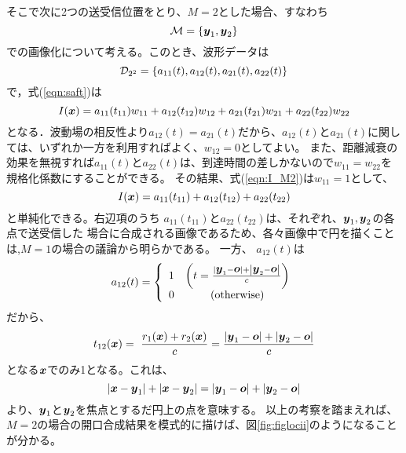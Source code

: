 \documentclass[10pt,a4j,dvipdfmx]{jarticle}
\begin{document}
そこで次に2つの送受信位置をとり、$M=2$とした場合、すなわち
\begin{equation}
	{\cal M} =\left\{ 
		\mbox{\boldmath $y$}_1, \mbox{\boldmath $y$}_2
	\right\}
	\label{eqn:M2}
\end{equation}
での画像化について考える。このとき、波形データは
\begin{equation}
	{\cal D}_{2^2}=\left\{ a_{11}(t), a_{12}(t), a_{21}(t), a_{22}(t)\right\}
	\label{eqn:}
\end{equation}
で，式(\ref{eqn:saft})は
\begin{equation}
	I(\mbox{\boldmath $x$})=a_{11}(t_{11})w_{11}+a_{12}(t_{12})w_{12}+a_{21}(t_{21})w_{21} + a_{22}(t_{22})w_{22}
	\label{eqn:I_M2}
\end{equation}
となる．波動場の相反性より$a_{12}(t)=a_{21}(t)$だから、$a_{12}(t)$と$a_{21}(t)$に関しては、いずれか一方を利用すればよく、$w_{12}=0$としてよい。
また、距離減衰の効果を無視すれば$a_{11}(t)$と$a_{22}(t)$は、到達時間の差しかないので$w_{11}=w_{22}$を規格化係数にすることができる。
その結果、式(\ref{eqn:I_M2})は$w_{11}=1$として、
\begin{equation}
	I(\mbox{\boldmath $x$})=a_{11}(t_{11})+a_{12}(t_{12})+ a_{22}(t_{22})
	\label{eqn:I_M2d}
\end{equation}
と単純化できる。右辺項のうち
$a_{11}(t_{11})$と$a_{22}(t_22)$は、それぞれ、$\mbox{\boldmath $y$}_1,\mbox{\boldmath $y$}_2$の各点で送受信した
場合に合成される画像であるため、各々画像中で円を描くことは,$M=1$の場合の議論から明らかである。
一方、 $a_{12}(t)$は
\begin{equation}
	a_{12}(t)=\left\{
	\begin{array}{cc}
		1 &  \left( t=\frac{|\mbox{\boldmath $y$}_1-\mbox{\boldmath $o$}|+\left|\mbox{\boldmath $y$}_2-\mbox{\boldmath $o$}\right|}{c}\right)\\
		0 &  ({\rm otherwise})
	\end{array}
	\right.
	\label{eqn:}
\end{equation}
だから、
\begin{equation}
	t_{12}(\mbox{\boldmath $x$})=\
	\frac{r_1(\mbox{\boldmath $x$})+r_2(\mbox{\boldmath $x$})}{c}
	=
	\frac{|\mbox{\boldmath $y$}_1-\mbox{\boldmath $o$}|+\left|\mbox{\boldmath $y$}_2-\mbox{\boldmath $o$}\right|}{c}
	\label{eqn:t12x}
\end{equation}
となる$\mbox{\boldmath $x$}$でのみ1となる。これは、
\begin{equation}
	|\mbox{\boldmath $x$}-\mbox{\boldmath $y$}_1|+\left|\mbox{\boldmath $x$}-\mbox{\boldmath $y$}_2\right|
	=
	|\mbox{\boldmath $y$}_1-\mbox{\boldmath $o$}|+\left|\mbox{\boldmath $y$}_2-\mbox{\boldmath $o$}\right|
	\label{eqn:}
\end{equation}
より、$\mbox{\boldmath $y$}_1$と$\mbox{\boldmath $y$}_2$を焦点とするだ円上の点を意味する。
以上の考察を踏まえれば、$M=2$の場合の開口合成結果を模式的に描けば、図\ref{fig:figlocii}のようになることが分かる。
\end{document}
